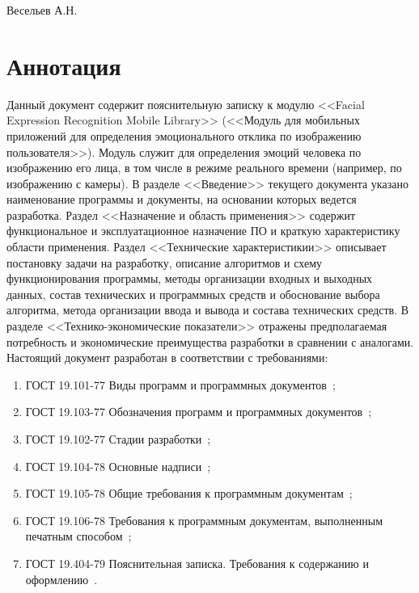 \documentclass[a4paper,12pt]{article}
\begin{document}
    {Весельев А.Н.}
    \firstPage
    \newpage
    \annotation
    \section*{Аннотация}
    Данный документ содержит пояснительную записку к модулю <<Facial Expression Recognition Mobile Library>> (<<Модуль для мобильных приложений для определения эмоционального отклика по изображению пользователя>>).
    Модуль служит для определения эмоций человека по изображению его лица, в том числе в режиме реального времени (например, по изображению с камеры).
    В разделе <<Введение>> текущего документа указано наименование программы и документы, на основании которых ведется разработка.
    Раздел <<Назначение и область применения>> содержит функциональное и эксплуатационное назначение ПО и краткую характеристику области применения.
    Раздел <<Технические характеристикии>> описывает постановку задачи на разработку, описание алгоритмов и схему функционирования программы, методы организации входных и выходных данных, состав технических и программных средств и обоснование выбора алгоритма, метода организации ввода и вывода и состава технических средств.
    В разделе <<Технико-экономические показатели>> отражены предполагаемая потребность и экономические преимущества разработки в сравнении с аналогами.
    Настоящий документ разработан в соответствии с требованиями:
    \begin{enumerate}
        \item ГОСТ 19.101-77 Виды программ и программных документов~\cite{gost1};
        \item ГОСТ 19.103-77 Обозначения программ и программных документов~\cite{gost2};
        \item ГОСТ 19.102-77 Стадии разработки~\cite{gost3};
        \item ГОСТ 19.104-78 Основные надписи~\cite{gost4};
        \item ГОСТ 19.105-78 Общие требования к программным документам~\cite{gost5};
        \item ГОСТ 19.106-78 Требования к программным документам, выполненным печатным способом~\cite{gost6};
        \item ГОСТ 19.404-79 Пояснительная записка. Требования к содержанию и оформлению~\cite{gost7}.
    \end{enumerate}
\end{document}
